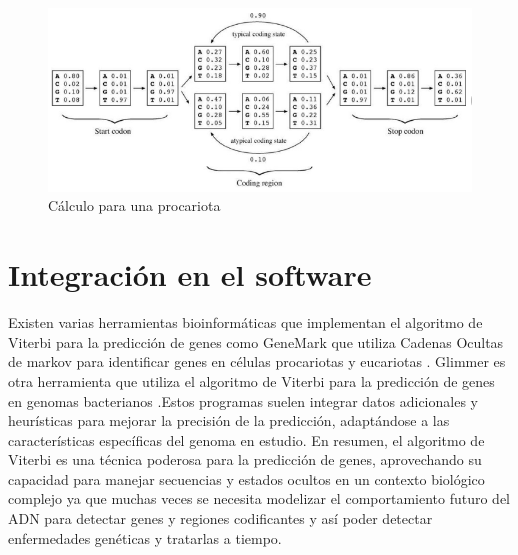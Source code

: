 \documentclass[11pt,openany]{book}
\begin{document}
\begin{figure}[H]
\centering
\begin{minipage}{.48\textwidth}
    \centering
    \includegraphics[width=1\linewidth]{assets/Img/dibujomarkov.png}
    \caption{Cálculo para una procariota}
    \label{fig:Uso del HMM}
\end{minipage}%
\end{figure}

\section{Integración en el software}

Existen varias herramientas bioinformáticas que implementan el algoritmo de Viterbi para la predicción de genes como 
GeneMark que utiliza Cadenas Ocultas de markov para identificar genes en células procariotas y eucariotas . Glimmer es otra herramienta que utiliza el algoritmo de Viterbi para la predicción de genes en 
genomas bacterianos .Estos programas suelen integrar datos adicionales y heurísticas para mejorar la precisión de la predicción, adaptándose a las características específicas del genoma en estudio.
En resumen, el algoritmo de Viterbi es una técnica poderosa para la predicción de genes, aprovechando su capacidad para manejar secuencias y estados ocultos en un contexto biológico complejo ya que muchas 
veces se necesita modelizar el comportamiento futuro del ADN para detectar genes y regiones codificantes y así poder detectar enfermedades genéticas y tratarlas a tiempo.
\end{document}
